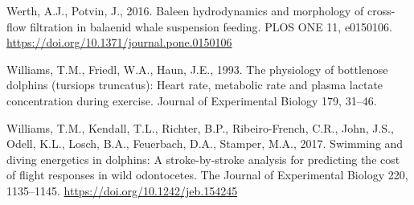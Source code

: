 \documentclass[]{elsarticle} %
\begin{document}
\hypertarget{ref-werth_baleen_2016}{}
Werth, A.J., Potvin, J., 2016. Baleen hydrodynamics and morphology of
cross-flow filtration in balaenid whale suspension feeding. PLOS ONE 11,
e0150106. \url{https://doi.org/10.1371/journal.pone.0150106}

\hypertarget{ref-williams_physiology_1993}{}
Williams, T.M., Friedl, W.A., Haun, J.E., 1993. The physiology of
bottlenose dolphins (tursiops truncatus): Heart rate, metabolic rate and
plasma lactate concentration during exercise. Journal of Experimental
Biology 179, 31--46.

\hypertarget{ref-williams_swimming_2017}{}
Williams, T.M., Kendall, T.L., Richter, B.P., Ribeiro-French, C.R.,
John, J.S., Odell, K.L., Losch, B.A., Feuerbach, D.A., Stamper, M.A.,
2017. Swimming and diving energetics in dolphins: A stroke-by-stroke
analysis for predicting the cost of flight responses in wild
odontocetes. The Journal of Experimental Biology 220, 1135--1145.
\url{https://doi.org/10.1242/jeb.154245}
\end{document}
